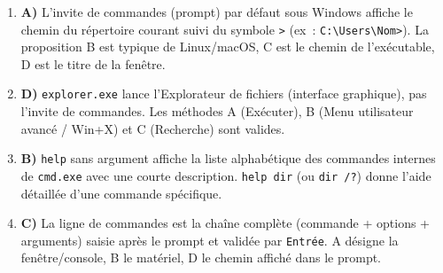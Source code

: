 \documentclass[11pt]{article}
\begin{document}
\begin{corrige}
\begin{enumerate}
    \item \textbf{A)} L'invite de commandes (prompt) par défaut sous Windows affiche le chemin du répertoire courant suivi du symbole \texttt{>} (ex~: \texttt{C:\textbackslash Users\textbackslash Nom>}). La proposition B est typique de Linux/macOS, C est le chemin de l'exécutable, D est le titre de la fenêtre.
    \item \textbf{D)} \texttt{explorer.exe} lance l'Explorateur de fichiers (interface graphique), pas l'invite de commandes. Les méthodes A (Exécuter), B (Menu utilisateur avancé / Win+X) et C (Recherche) sont valides.
    \item \textbf{B)} \texttt{help} sans argument affiche la liste alphabétique des commandes internes de \texttt{cmd.exe} avec une courte description. \texttt{help dir} (ou \texttt{dir /?}) donne l'aide détaillée d'une commande spécifique.
    \item \textbf{C)} La ligne de commandes est la chaîne complète (commande + options + arguments) saisie après le prompt et validée par \texttt{Entrée}. A désigne la fenêtre/console, B le matériel, D le chemin affiché dans le prompt.
\end{enumerate}
\end{corrige}
\end{document}
